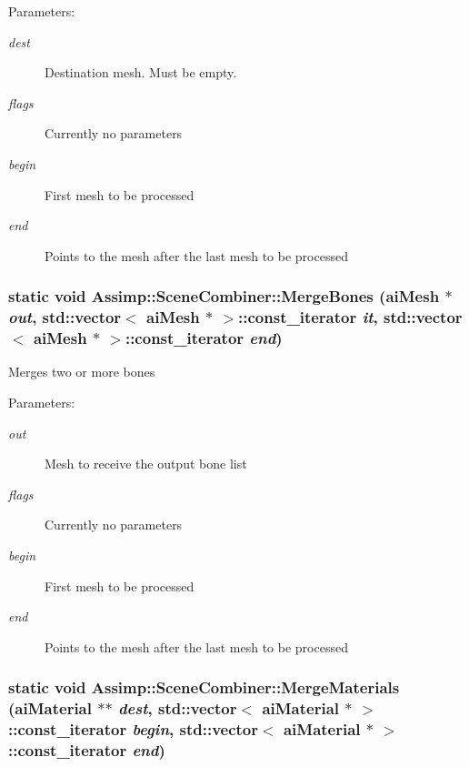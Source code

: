 \begin{Desc}
\item[Parameters:]
\begin{description}
\item[{\em dest}]Destination mesh. Must be empty. \item[{\em flags}]Currently no parameters \item[{\em begin}]First mesh to be processed \item[{\em end}]Points to the mesh after the last mesh to be processed \end{description}
\end{Desc}
\hypertarget{class_assimp_1_1_scene_combiner_a42d5370510db89cbdd739617a617d4e}{
\subsubsection[MergeBones]{\setlength{\rightskip}{0pt plus 5cm}static void Assimp::SceneCombiner::MergeBones ({\bf aiMesh} $\ast$ {\em out}, \/  std::vector$<$ {\bf aiMesh} $\ast$ $>$::const\_\-iterator {\em it}, \/  std::vector$<$ {\bf aiMesh} $\ast$ $>$::const\_\-iterator {\em end})}}
\label{class_assimp_1_1_scene_combiner_a42d5370510db89cbdd739617a617d4e}


Merges two or more bones

\begin{Desc}
\item[Parameters:]
\begin{description}
\item[{\em out}]Mesh to receive the output bone list \item[{\em flags}]Currently no parameters \item[{\em begin}]First mesh to be processed \item[{\em end}]Points to the mesh after the last mesh to be processed \end{description}
\end{Desc}
\hypertarget{class_assimp_1_1_scene_combiner_9ebdb2b454f84032f2cfb51ebd7d5716}{
\subsubsection[MergeMaterials]{\setlength{\rightskip}{0pt plus 5cm}static void Assimp::SceneCombiner::MergeMaterials ({\bf aiMaterial} $\ast$$\ast$ {\em dest}, \/  std::vector$<$ {\bf aiMaterial} $\ast$ $>$::const\_\-iterator {\em begin}, \/  std::vector$<$ {\bf aiMaterial} $\ast$ $>$::const\_\-iterator {\em end})}}
\label{class_assimp_1_1_scene_combiner_9ebdb2b454f84032f2cfb51ebd7d5716}


